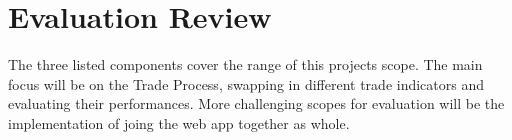 \section{Evaluation Review}
\label{sec:evaluation:review}

\noindent The three listed components cover the range of this projects scope. The main focus will be on the Trade Process, swapping in different trade indicators and evaluating their performances. More challenging scopes for evaluation will be the implementation of joing the web app together as whole.